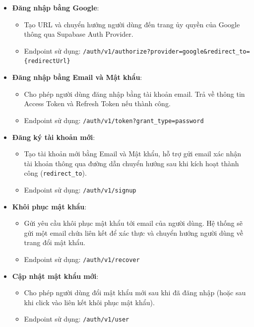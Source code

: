 \begin{itemize}
\item \textbf{Đăng nhập bằng Google}:
\begin{itemize}
\item Tạo URL và chuyển hướng người dùng đến trang ủy quyền của Google thông qua Supabase Auth Provider.
\item Endpoint sử dụng: \texttt{/auth/v1/authorize?provider=google\&redirect\_to=\{redirectUrl\}}
\end{itemize}

\item \textbf{Đăng nhập bằng Email và Mật khẩu}:
\begin{itemize}
\item Cho phép người dùng đăng nhập bằng tài khoản email. Trả về thông tin Access Token và Refresh Token nếu thành công.
\item Endpoint sử dụng: \texttt{/auth/v1/token?grant\_type=password}
\end{itemize}

\item \textbf{Đăng ký tài khoản mới}:
\begin{itemize}
\item Tạo tài khoản mới bằng Email và Mật khẩu, hỗ trợ gửi email xác nhận tài khoản thông qua đường dẫn chuyển hướng sau khi kích hoạt thành công (\texttt{redirect\_to}).
\item Endpoint sử dụng: \texttt{/auth/v1/signup}
\end{itemize}

\item \textbf{Khôi phục mật khẩu}:
\begin{itemize}
\item Gửi yêu cầu khôi phục mật khẩu tới email của người dùng. Hệ thống sẽ gửi một email chứa liên kết để xác thực và chuyển hướng người dùng về trang đổi mật khẩu.
\item Endpoint sử dụng: \texttt{/auth/v1/recover}
\end{itemize}

\item \textbf{Cập nhật mật khẩu mới}:
\begin{itemize}
\item Cho phép người dùng đổi mật khẩu mới sau khi đã đăng nhập (hoặc sau khi click vào liên kết khôi phục mật khẩu).
\item Endpoint sử dụng: \texttt{/auth/v1/user}
\end{itemize}


\end{itemize}
